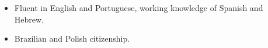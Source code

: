   
\begin{itemize}[leftmargin=*]
    \item Fluent in English and Portuguese, working knowledge of Spanish and Hebrew.
    \item Brazilian and Polish citizenship.
\end{itemize}
